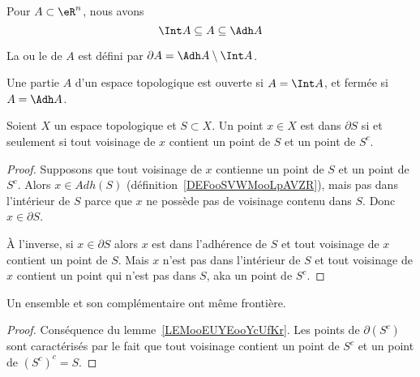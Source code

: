 \begin{proposition}
	Pour \( A \subset \eR^n\), nous avons
	\begin{equation*}
		\Int A \subseteq A  \subseteq \Adh A
	\end{equation*}
\end{proposition}

\begin{definition}      \label{DEFooACVLooRwehTl}
	La  ou le  de \( A\) est défini par \( \partial A = \Adh A \setminus \Int A\).
\end{definition}

\begin{lemma}       \label{LEMooMPZWooGrqYIX}
	Une partie \( A\) d'un espace topologique est ouverte si \( A = \Int A\), et fermée si \( A = \Adh A\).
\end{lemma}

\begin{lemma}      \label{LEMooEUYEooYcUfKr}
	Soient \( X\) un espace topologique et \( S\subset X\). Un point \( x\in X\) est dans \( \partial S\) si et seulement si tout voisinage de \( x\) contient un point de \( S\) et un point de \( S^c\).
\end{lemma}

\begin{proof}
	Supposons que tout voisinage de \( x\) contienne un point de \( S\) et un point de \( S^c\). Alors \( x\in Adh(S)\) (définition~\ref{DEFooSVWMooLpAVZR}), mais pas dans l'intérieur de \( S\) parce que \( x\) ne possède pas de voisinage contenu dans \( S\). Donc \( x\in \partial S\).

	À l'inverse, si \( x\in\partial S\) alors \( x\) est dans l'adhérence de \( S\) et tout voisinage de \( x\) contient un point de \( S\). Mais \( x\) n'est pas dans l'intérieur de \( S\) et tout voisinage de \( x\) contient un point qui n'est pas dans \( S\), aka un point de \( S^c\).
\end{proof}

\begin{corollary}
	Un ensemble et son complémentaire ont même frontière.
\end{corollary}

\begin{proof}
	Conséquence du lemme~\ref{LEMooEUYEooYcUfKr}. Les points de \( \partial(S^c)\) sont caractérisés par le fait que tout voisinage contient un point de \( S^c\) et un point de \( (S^c)^c=S\).
\end{proof}

